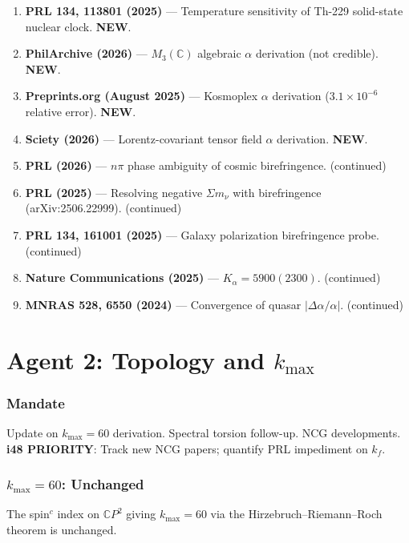 \documentclass[11pt,a4paper]{article}
\newcommand{\NEW}{\textcolor{dfdblue}{\textbf{NEW}}}
\newcommand{\CP}{\mathbb{C}P}
\begin{document}
\begin{enumerate}
\item \textbf{PRL 134, 113801 (2025)} --- Temperature sensitivity of Th-229 solid-state nuclear clock. \NEW.
\item \textbf{PhilArchive (2026)} --- $M_3(\mathbb{C})$ algebraic $\alpha$ derivation (not credible). \NEW.
\item \textbf{Preprints.org (August 2025)} --- Kosmoplex $\alpha$ derivation ($3.1 \times 10^{-6}$ relative error). \NEW.
\item \textbf{Sciety (2026)} --- Lorentz-covariant tensor field $\alpha$ derivation. \NEW.
\item \textbf{PRL (2026)} --- $n\pi$ phase ambiguity of cosmic birefringence. (continued)
\item \textbf{PRL (2025)} --- Resolving negative $\Sigma m_\nu$ with birefringence (arXiv:2506.22999). (continued)
\item \textbf{PRL 134, 161001 (2025)} --- Galaxy polarization birefringence probe. (continued)
\item \textbf{Nature Communications (2025)} --- $K_\alpha = 5900(2300)$. (continued)
\item \textbf{MNRAS 528, 6550 (2024)} --- Convergence of quasar $|\Delta\alpha/\alpha|$. (continued)
\end{enumerate}


\part{Agent 2: Topology and $k_{\max}$}
\label{part:agent2}

\section{Mandate}

Update on $k_{\max} = 60$ derivation. Spectral torsion follow-up. NCG developments. \textbf{i48 PRIORITY}: Track new NCG papers; quantify PRL impediment on $k_f$.

\section{$k_{\max} = 60$: Unchanged}

The spin$^c$ index on $\CP^2$ giving $k_{\max} = 60$ via the Hirzebruch--Riemann--Roch theorem is unchanged.
\end{document}
